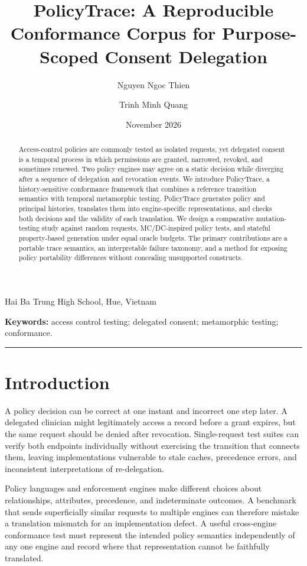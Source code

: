 \documentclass[11pt,a4paper]{article}
\title{\vspace{-1em}\textbf{PolicyTrace: A Reproducible Conformance Corpus for Purpose-Scoped Consent Delegation}}
\author{Nguyen Ngoc Thien \and Trinh Minh Quang}\date{November 2026}
\begin{document}
\maketitle
\begin{center}\small Hai Ba Trung High School, Hue, Vietnam\end{center}
\begin{abstract}
Access-control policies are commonly tested as isolated requests, yet delegated consent is a temporal process in which permissions are granted, narrowed, revoked, and sometimes renewed. Two policy engines may agree on a static decision while diverging after a sequence of delegation and revocation events. We introduce PolicyTrace, a history-sensitive conformance framework that combines a reference transition semantics with temporal metamorphic testing. PolicyTrace generates policy and principal histories, translates them into engine-specific representations, and checks both decisions and the validity of each translation. We design a comparative mutation-testing study against random requests, MC/DC-inspired policy tests, and stateful property-based generation under equal oracle budgets. The primary contributions are a portable trace semantics, an interpretable failure taxonomy, and a method for exposing policy portability differences without concealing unsupported constructs.
\end{abstract}
\noindent\textbf{Keywords:} access control testing; delegated consent; metamorphic testing; conformance.
\medskip\hrule\medskip

\section{Introduction}
A policy decision can be correct at one instant and incorrect one step later. A delegated clinician might legitimately access a record before a grant expires, but the same request should be denied after revocation. Single-request test suites can verify both endpoints individually without exercising the transition that connects them, leaving implementations vulnerable to stale caches, precedence errors, and inconsistent interpretations of re-delegation.

Policy languages and enforcement engines make different choices about relationships, attributes, precedence, and indeterminate outcomes. A benchmark that sends superficially similar requests to multiple engines can therefore mistake a translation mismatch for an implementation defect. A useful cross-engine conformance test must represent the intended policy semantics independently of any one engine and record where that representation cannot be faithfully translated.
\end{document}

